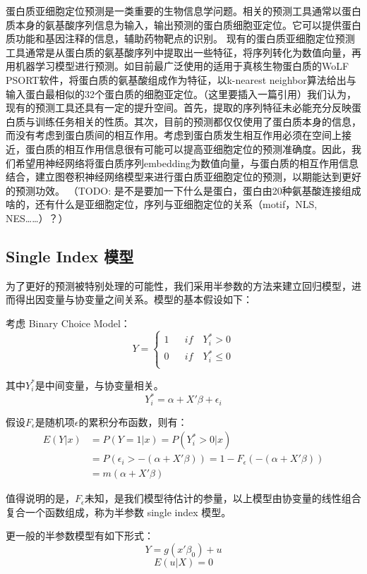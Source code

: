 \documentclass[a4paper,UTF8]{article}
\begin{document}
蛋白质亚细胞定位预测是一类重要的生物信息学问题。相关的预测工具通常以蛋白质本身的氨基酸序列信息为输入，输出预测的蛋白质细胞亚定位。它可以提供蛋白质功能和基因注释的信息，辅助药物靶点的识别。
现有的蛋白质亚细胞定位预测工具通常是从蛋白质的氨基酸序列中提取出一些特征，将序列转化为数值向量，再用机器学习模型进行预测。如目前最广泛使用的适用于真核生物蛋白质的WoLF PSORT软件，将蛋白质的氨基酸组成作为特征，以k-nearest neighbor算法给出与输入蛋白最相似的32个蛋白质的细胞亚定位。（这里要插入一篇引用）我们认为，现有的预测工具还具有一定的提升空间。首先，提取的序列特征未必能充分反映蛋白质与训练任务相关的性质。其次，目前的预测都仅仅使用了蛋白质本身的信息，而没有考虑到蛋白质间的相互作用。考虑到蛋白质发生相互作用必须在空间上接近，蛋白质的相互作用信息很有可能可以提高亚细胞定位的预测准确度。因此，我们希望用神经网络将蛋白质序列embedding为数值向量，与蛋白质的相互作用信息结合，建立图卷积神经网络模型来进行蛋白质亚细胞定位的预测，以期能达到更好的预测功效。
（TODO: 是不是要加一下什么是蛋白，蛋白由20种氨基酸连接组成啥的，还有什么是亚细胞定位，序列与亚细胞定位的关系（motif，NLS, NES……）？）



\subsection{Single Index 模型}
为了更好的预测被特别处理的可能性，我们采用半参数的方法来建立回归模型，进而得出因变量与协变量之间关系。模型的基本假设如下：

考虑 Binary Choice Model：
$$ Y = \left\{
\begin{array}{rcl}
1     &      & {if \quad Y_i^{*}>0}\\
0     &      & {if \quad Y_i^{*}\leq0}\\
\end{array} \right. $$

其中$Y_i^{*}$是中间变量，与协变量相关。
\[ Y_i^{*}=\alpha+X'\beta+\epsilon_i \]

假设$F_\epsilon$是随机项$\epsilon$的累积分布函数，则有：
\begin{align*}
E(Y|x)&=P(Y=1|x)=P(Y_i^{*}>0|x)\\
&=P(\epsilon_i>-(\alpha+X'\beta))=1-F_\epsilon(-(\alpha+X'\beta))\\
&=m(\alpha+X'\beta)
\end{align*}

值得说明的是，$F_\epsilon$未知，是我们模型待估计的参量，以上模型由协变量的线性组合复合一个函数组成，称为半参数 single index 模型。

更一般的半参数模型有如下形式：
\[  Y=g(x'\beta_0)+u  \]
\[ E(u|X)=0 \]
\end{document}
